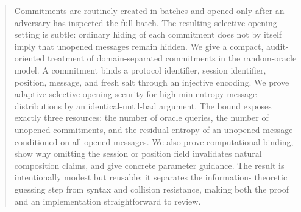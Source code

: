 \documentclass[runningheads]{llncs}
\begin{document}
\maketitle

\begin{abstract}
Commitments are routinely created in batches and opened only after an
adversary has inspected the full batch.  The resulting selective-opening
setting is subtle: ordinary hiding of each commitment does not by itself imply
that unopened messages remain hidden.  We give a compact, audit-oriented
treatment of domain-separated commitments in the random-oracle model.  A
commitment binds a protocol identifier, session identifier, position, message,
and fresh salt through an injective encoding.  We prove adaptive
selective-opening security for high-min-entropy message distributions by an
identical-until-bad argument.  The bound exposes exactly three resources: the
number of oracle queries, the number of unopened commitments, and the residual
entropy of an unopened message conditioned on all opened messages.  We also
prove computational binding, show why omitting the session or position field
invalidates natural composition claims, and give concrete parameter guidance.
The result is intentionally modest but reusable: it separates the information-
theoretic guessing step from syntax and collision resistance, making both the
proof and an implementation straightforward to review.

\end{abstract}












\end{document}

